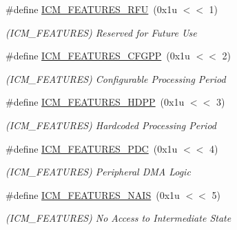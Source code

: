 \begin{DoxyCompactItemize}
\#define \mbox{\hyperlink{group__SAMV71__ICM_ga765e6a27d5ea63e814bc3370cd113b57}{I\+C\+M\+\_\+\+F\+E\+A\+T\+U\+R\+E\+S\+\_\+\+R\+FU}}~(0x1u $<$$<$ 1)
\begin{DoxyCompactList}\small\item\em (I\+C\+M\+\_\+\+F\+E\+A\+T\+U\+R\+ES) Reserved for Future Use \end{DoxyCompactList}\item 
\mbox{\label{group__SAMV71__ICM_ga1153a3974fd261dbf67fad8b86c39837}} 
\#define \mbox{\hyperlink{group__SAMV71__ICM_ga1153a3974fd261dbf67fad8b86c39837}{I\+C\+M\+\_\+\+F\+E\+A\+T\+U\+R\+E\+S\+\_\+\+C\+F\+G\+PP}}~(0x1u $<$$<$ 2)
\begin{DoxyCompactList}\small\item\em (I\+C\+M\+\_\+\+F\+E\+A\+T\+U\+R\+ES) Configurable Processing Period \end{DoxyCompactList}\item 
\mbox{\label{group__SAMV71__ICM_gaee2cdae8c112f58038a528908789615a}} 
\#define \mbox{\hyperlink{group__SAMV71__ICM_gaee2cdae8c112f58038a528908789615a}{I\+C\+M\+\_\+\+F\+E\+A\+T\+U\+R\+E\+S\+\_\+\+H\+D\+PP}}~(0x1u $<$$<$ 3)
\begin{DoxyCompactList}\small\item\em (I\+C\+M\+\_\+\+F\+E\+A\+T\+U\+R\+ES) Hardcoded Processing Period \end{DoxyCompactList}\item 
\mbox{\label{group__SAMV71__ICM_gae37baa45fd399eada4490fb1a39455ab}} 
\#define \mbox{\hyperlink{group__SAMV71__ICM_gae37baa45fd399eada4490fb1a39455ab}{I\+C\+M\+\_\+\+F\+E\+A\+T\+U\+R\+E\+S\+\_\+\+P\+DC}}~(0x1u $<$$<$ 4)
\begin{DoxyCompactList}\small\item\em (I\+C\+M\+\_\+\+F\+E\+A\+T\+U\+R\+ES) Peripheral D\+MA Logic \end{DoxyCompactList}\item 
\mbox{\label{group__SAMV71__ICM_gac70eccbab7a91b4d2adbb7955046ad78}} 
\#define \mbox{\hyperlink{group__SAMV71__ICM_gac70eccbab7a91b4d2adbb7955046ad78}{I\+C\+M\+\_\+\+F\+E\+A\+T\+U\+R\+E\+S\+\_\+\+N\+A\+IS}}~(0x1u $<$$<$ 5)
\begin{DoxyCompactList}\small\item\em (I\+C\+M\+\_\+\+F\+E\+A\+T\+U\+R\+ES) No Access to Intermediate State \end{DoxyCompactList}\item 
$$
\end{DoxyCompactItemize}
